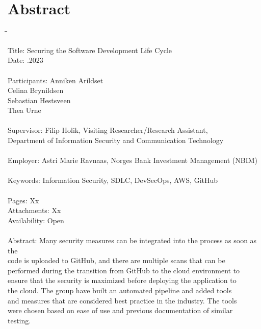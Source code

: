 
\chapter*{Abstract}

\begin{tabbing}
\hspace{2cm}\=\hspace{3cm}\=\kill %

Title: \> \> Securing the Software Development Life Cycle \\
Date: \> .2023 \\ 
\\
Participants: \> \> Anniken Arildset \\ \> \> Celina Brynildsen \\ \> \> Sebastian Hestsveen \\ \> \> Thea Urne \\
\\
Supervisor: \> \> Filip Holik, Visiting Researcher/Research Assistant, \\\> \> Department of Information Security and Communication Technology \\
\\
Employer: \> \>  Astri Marie Ravnaas, Norges Bank Investment Management (NBIM) \\
\\
Keywords: \> \> Information Security, SDLC, DevSecOps, AWS, GitHub \\
\\
Pages: \> \> Xx \\
Attachments: \> \> Xx \\
Availability: \> \> Open \\
\\
Abstract: \> \> Many security measures can be integrated into the process as soon as the \\ \> \> code is uploaded to GitHub, and there are multiple scans that can be\\ \> \> performed during the transition from GitHub to the cloud environment to\\ \> \> ensure that the security is maximized before deploying the application to \\ \> \>the cloud. The group have built an automated pipeline and added tools\\ \> \>and measures that are considered best practice in the industry. The tools\\ \> \> were chosen based on ease of use and previous documentation of similar\\ \> \> testing. 



\end{tabbing}
